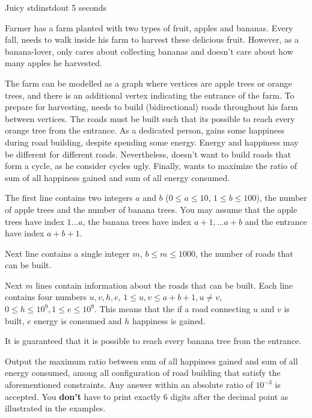 \begin{problem}{Juicy}
{stdin}{stdout}
{5 seconds}{}{}

Farmer \pittoresque has a farm planted with two types of fruit, apples and bananas. Every fall, \pittoresque needs to walk inside his farm to harvest these delicious fruit. However, as a banana-lover, \pittoresque only cares about collecting bananas and doesn't care about how many apples he harvested. 

The farm can be modelled as a graph where vertices are apple trees or orange trees, and there is an additional vertex indicating the entrance of the farm. To prepare for harvesting, \pittoresque needs to build (bidirectional) roads throughout his farm between vertices. The roads must be built such that its possible to reach every orange tree from the entrance. As a dedicated person, \pittoresque gains some happiness during road building, despite spending some energy. Energy and happiness may be different for different roads. Nevertheless, \pittoresque doesn't want to build roads that form a cycle, as he consider cycles ugly. Finally, \pittoresque wants to maximize the ratio of sum of all happiness gained and sum of all energy consumed.

\InputFile

The first line contains two integers $a$ and $b$ ($0 \le a \le 10$, $1 \le b \le 100$), the number of apple trees and the number of banana trees. You may assume that the apple trees have index $1 ... a$, the banana trees have index $a + 1, ... a + b$ and the entrance have index $a + b + 1$.

Next line contains a single integer $m$, $b \leq m \leq 1000$, the number of roads that can be built.

Next $m$ lines contain information about the roads that can be built. Each line contains four numbers $u, v, h, e$, $1 \le u, v \le a + b + 1, u \neq v$, $0 \le h \le 10^9, 1 \le e \le 10^9$. This means that the if a road connecting $u$ and $v$ is built, $e$ energy is consumed and $h$ happiness is gained.

It is guaranteed that it is possible to reach every banana tree from the entrance.

\OutputFile

Output the maximum ratio between sum of all happiness gained and sum of all energy consumed, among all configuration of road building that satisfy the aforementioned constraints. Any answer within an absolute ratio of $10^{-3}$ is accepted. You \textbf{don't} have to print exactly 6 digits after the decimal point as illustrated in the examples.

\Examples

\begin{example}
%
\end{example}

\begin{example}
%
\end{example}



\end{problem}